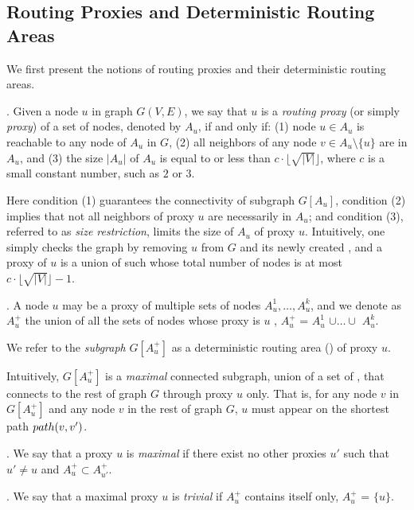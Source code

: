\subsection{Routing Proxies and Deterministic Routing Areas}
\label{subsec-proxy-def}

We first present the notions of routing proxies and their deterministic routing areas.

. Given a node $u$ in graph $G(V, E)$, we say that $u$ is a {\em routing proxy} (or simply {\em proxy}) of a set of nodes, denoted by $A_{u}$, if and only if:
\sstab(1) node $u\in A_{u}$ is reachable to any node of $A_u$ in $G$,
\sstab(2) all neighbors of any node $v\in A_u\setminus \{u\}$ are in $A_u$,  and
\sstab(3) the size $|A_u|$ of $A_u$ is equal to or less than $c\cdot\lfloor\sqrt{|V|}\rfloor$, where $c$ is a small constant number, such as $2$ or $3$.


Here condition (1) guarantees the connectivity of subgraph $G[A_u]$,  condition (2) implies that not all neighbors of proxy $u$ are necessarily in $A_u$;
and condition (3), referred to as {\em size restriction}, limits the size of $A_u$ of proxy $u$.
Intuitively, one simply checks the graph by removing $u$ from $G$ and its newly created
\ccs , and a proxy of $u$ is a union of such \ccs whose total number of nodes is at most $c\cdot\lfloor\sqrt{|V|}\rfloor - 1$.




. A node $u$ may be a proxy of multiple sets of nodes $A^1_u, \ldots, A^k_u$, and 
we denote as $A^{+}_u$ the union of all the sets of nodes whose proxy is $u$ , \ie  $A^{+}_u$ = $A^1_u$ $\cup\ldots\cup$ $A^k_u$.

We refer to the {\em subgraph} $G[A^+_u]$ as a deterministic routing area (\dra) of proxy $u$.

Intuitively, \dra $G[A^+_u]$ is a {\em maximal} connected subgraph, union of a set of \ccs, that connects to the rest of graph $G$ through proxy $u$ only.
That is, for any node $v$ in $G[A^+_u]$ and any node $v$ in the rest of graph $G$, $u$ must appear on the shortest path $\path(v, v')$.  

.  We say that a proxy $u$ is {\em maximal} if there exist no other proxies $u'$ such that $u'\ne u$ and $A^+_{u} \subset A^+_{u'}$.

. We say that a maximal proxy $u$ is {\em trivial} if $A^+_u$ contains itself only, \ie $A^+_{u}$ = $\{u\}$.


